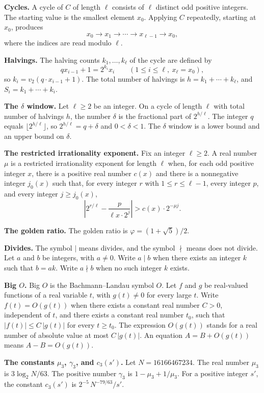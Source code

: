 \documentclass[11pt]{article}
\newcommand{\topic}[1]{\par\noindent\textbf{#1}}
\begin{document}
\topic{Cycles.}
A cycle of $C$ of length $\ell$ consists of $\ell$ distinct odd positive integers.
The starting value is the smallest element $x_0$.
Applying $C$ repeatedly, starting at $x_0$, produces
\[
x_0 \to x_1 \to \cdots \to x_{\ell-1} \to x_0,
\]
where the indices are read modulo $\ell$.

\topic{Halvings.}
The halving counts $k_1, \ldots, k_\ell$ of the cycle are defined by
\[
q x_{i-1} + 1 = 2^{k_i} x_i
\qquad (1 \le i \le \ell,\ x_\ell = x_0),
\]
so $k_i = v_2(q \cdot x_{i-1} + 1)$.
The total number of halvings is $h = k_1 + \cdots + k_\ell$, and $S_i = k_1 + \cdots + k_i$.

\topic{The $\delta$ window.}
Let $\ell \ge 2$ be an integer.
On a cycle of length $\ell$ with total number of halvings $h$, the number $\delta$ is the fractional part of $2^{h/\ell}$.
The integer $q$ equals $\lfloor 2^{h/\ell} \rfloor$, so $2^{h/\ell} = q + \delta$ and $0 < \delta < 1$.
The $\delta$ window is a lower bound and an upper bound on $\delta$.

\topic{The restricted irrationality exponent.}
Fix an integer $\ell \ge 2$.
A real number $\mu$ is a restricted irrationality exponent for length $\ell$ when, for each odd positive integer $x$, there is a positive real number $c(x)$ and there is a nonnegative integer $j_0(x)$ such that, for every integer $r$ with $1 \le r \le \ell - 1$, every integer $p$, and every integer $j \ge j_0(x)$,
\[
\left| 2^{r/\ell} - \frac{p}{\ell x \cdot 2^j} \right| > c(x) \cdot 2^{-\mu j}.
\]

\topic{The golden ratio.}
The golden ratio is $\varphi = (1 + \sqrt{5})/2$.

\topic{Divides.}
The symbol $\mid$ means divides, and the symbol $\nmid$ means does not divide.
Let $a$ and $b$ be integers, with $a \ne 0$.
Write $a \mid b$ when there exists an integer $k$ such that $b = ak$.
Write $a \nmid b$ when no such integer $k$ exists.

\topic{Big $O$.}
Big $O$ is the Bachmann--Landau symbol $O$.
Let $f$ and $g$ be real-valued functions of a real variable $t$, with $g(t) \ne 0$ for every large $t$.
Write $f(t) = O(g(t))$ when there exists a constant real number $C > 0$, independent of $t$, and there exists a constant real number $t_0$, such that $|f(t)| \le C\,|g(t)|$ for every $t \ge t_0$.
The expression $O(g(t))$ stands for a real number of absolute value at most $C\,|g(t)|$.
An equation $A = B + O(g(t))$ means $A - B = O(g(t))$.

\topic{The constants $\mu_3$, $\gamma_3$, and $c_3(s')$.}
Let $N = 16166467234$.
The real number $\mu_3$ is $3\log_2 N/63$.
The positive number $\gamma_3$ is $1 - \mu_3 + 1/\mu_3$.
For a positive integer $s'$, the constant $c_3(s')$ is $2^{-5}\, N^{-79/63}/s'$.
\end{document}
